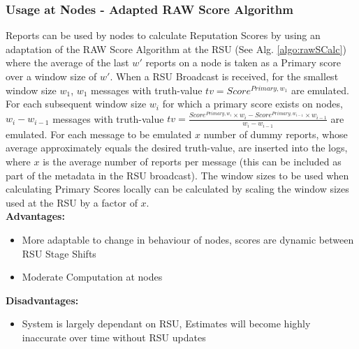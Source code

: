 \documentclass[journal]{IEEEtran}
\begin{document}
\subsubsection{Usage at Nodes - Adapted RAW Score Algorithm}
\label{sec:PM:usage:raw@node}
Reports can be used by nodes to calculate Reputation Scores by using an adaptation of the RAW Score Algorithm at the RSU (See Alg. \ref{algo:rawSCalc}) where the average of the last $ w' $ reports on a node is taken as a Primary score over a window size of $ w' $. When a RSU Broadcast is received, for the smallest window size $ w_1 $, $ w_1 $ messages with truth-value $ tv = Score^{Primary,w_1} $ are emulated. For each subsequent window size $ w_i $ for which a primary score exists on nodes, $ w_i - w_{i-1} $ messages with truth-value $ tv = \frac{Score^{Primary,w_i}\times w_i - Score^{Primary,w_{i-1}}\times w_{i-1}}{w_i - w_{i-1}} $ are emulated. For each message to be emulated $ x $ number of dummy reports, whose average approximately equals the desired truth-value, are inserted into the logs, where $ x $ is the average number of reports per message (this can be included as part of the metadata in the RSU broadcast). The window sizes to be used when calculating Primary Scores locally can be calculated by scaling the window sizes used at the RSU by a factor of $ x $.\\
\textbf{Advantages:}
	\begin{itemize}
		\item More adaptable to change in behaviour of nodes, scores are dynamic between RSU Stage Shifts
		\item Moderate Computation at nodes
	\end{itemize}
\textbf{Disadvantages:} 
	\begin{itemize}
		\item System is largely dependant on RSU, Estimates will become highly inaccurate over time without RSU updates
	\end{itemize}
\end{document}
